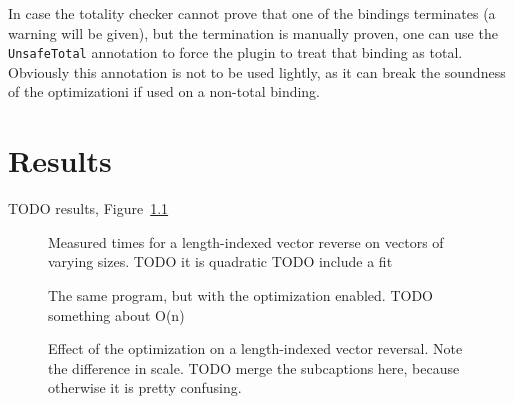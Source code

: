 In case the totality checker cannot prove that one of the bindings terminates (a warning will be given), but the termination is manually proven, one can use the \texttt{UnsafeTotal} annotation to force the plugin to treat that binding as total.
Obviously this annotation is not to be used lightly, as it can break the soundness of the optimizationi if used on a non-total binding.

\chapter{Results}
\label{cha:results}

TODO results, Figure~\ref{fig:bench1}

\begin{figure}
  \begin{minipage}{0.5\textwidth}
    \caption{Measured times for a length-indexed vector reverse on vectors of varying sizes. TODO it is quadratic TODO include a fit}\label{fig:bench1:a}
  \end{minipage}
  \begin{minipage}{0.5\textwidth}
    \caption{The same program, but with the optimization enabled. TODO something about O(n)}\label{fig:bench1:b}
  \end{minipage}
  \caption{Effect of the optimization on a length-indexed vector reversal. Note the difference in scale. TODO merge the subcaptions here, because otherwise it is pretty confusing.}
  \label{fig:bench1}
\end{figure}

